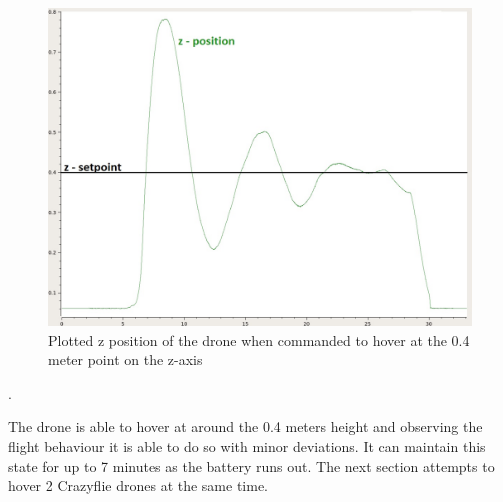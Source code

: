 \begin{figure}[H]
\centering
 \includegraphics[scale=0.25]{Figures/hover_single.jpg}
 \caption{Plotted z position of the drone when commanded to hover at the 0.4 meter point on the z-axis}
 \label{figure:plot_hover_single}
\end{figure}.

The drone is able to hover at around the 0.4 meters height and observing the flight behaviour it is able to do so with minor deviations. It can maintain this state for up to 7 minutes as the battery runs out. The next section attempts to hover 2 Crazyflie drones at the same time.
